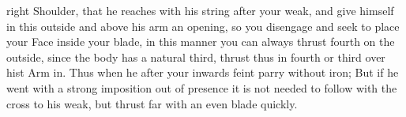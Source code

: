 \newpage


\newpage


right Shoulder, that he reaches with his string after your weak, and
give himself in this  outside and above his arm an opening, so you
disengage and seek to place your Face inside your blade, in this
manner you can always thrust fourth on the outside, since the body has
a natural third, thrust thus in fourth or third over hist Arm in. Thus
when he after your inwards feint parry without iron; But if he went
with a strong imposition out of presence it is not needed to follow
with the cross to his weak, but thrust far with an even blade quickly.


